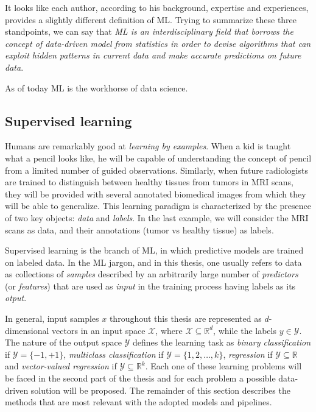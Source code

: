 It looks like each author, according to his background, expertise and experiences, provides a slightly different definition of ML. Trying to summarize these three standpoints, we can say that \emph{ML is an interdisciplinary field that borrows the concept of data-driven model from statistics in order to devise algorithms that can exploit hidden patterns in current data and make accurate predictions on future data}.

As of today ML is the workhorse of data science.


  \subsection{Supervised learning} \label{subsec:supervised_learning}

  Humans are remarkably good at \emph{learning by examples}. When a kid is taught what a pencil looks like, he will be capable of understanding the concept of pencil from a limited number of guided observations. Similarly, when future radiologists are trained to distinguish between healthy tissues from tumors in MRI scans, they will be provided with several annotated biomedical images from which they will be able to generalize.
  This learning paradigm is characterized by the presence of two key objects: \textit{data} and \textit{labels}. In the last example, we will consider the MRI scans as data, and their annotations (\eg tumor vs healthy tissue) as labels.

  Supervised learning is the branch of ML, in which predictive models are trained on labeled data. In the ML jargon, and in this thesis, one usually refers to data as collections of \textit{samples} described by an arbitrarily large number of \textit{predictors} (or \textit{features}) that are used as \textit{input} in the training process having labels as its \textit{otput}.

  In general, input samples $x$ throughout this thesis are represented as $d$-dimensional vectors in an input space $\mathcal{X}$, where $\mathcal{X}\subseteq\mathbb{R}^d$, while the labels $y\in\mathcal{Y}$. The nature of the output space $\mathcal{Y}$ defines the learning task as \textit{binary classification} if  $\mathcal{Y} = \{-1,+1\}$, \textit{multiclass classification} if $\mathcal{Y} = \{1,2,\dots,k\}$,
  \textit{regression} if $\mathcal{Y}\subseteq\mathds{R}$ and
  \textit{vector-valued regression} if $\mathcal{Y}\subseteq\mathds{R}^k$.
  Each one of these learning problems will be faced in the second part of the thesis and for each problem a possible data-driven solution will be proposed. The remainder of this section describes the methods that are most relevant with the adopted models and pipelines.


